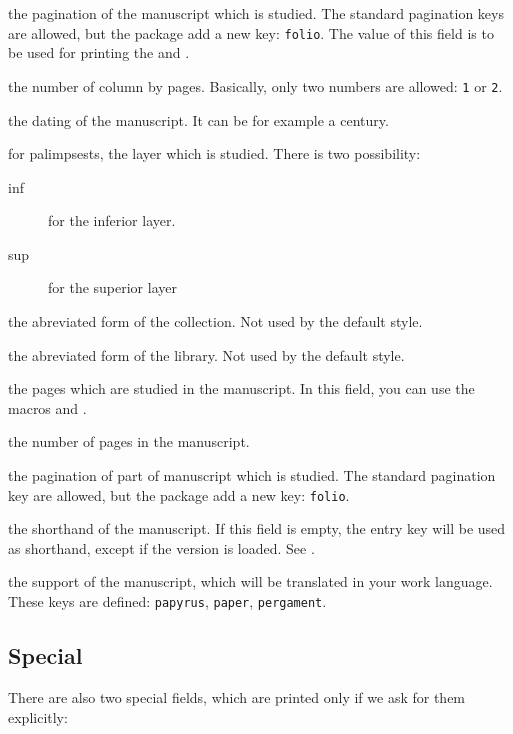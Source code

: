 \documentclass{ltxdockit}[2011/03/25]
\begin{document}
\begin{fieldlist}

 the pagination of the manuscript which is studied. The standard pagination keys are allowed, but the package add a new key: \texttt{folio}. The value of this field is to be used for printing the  and .

 the number of column by pages. Basically, only two numbers are allowed: \verb+1+ or \verb+2+.

 the dating of the manuscript. It can be for example a century.

\label{field:layer} for palimpsests, the layer which is studied. There is two possibility: 
	\begin{description}
		\item[inf] for the inferior layer.
		\item[sup] for the superior layer 
	\end{description}

 the abreviated form of the collection. Not used by the default style.\label{field:shortcollection}


 the abreviated form of the library. Not used by the default style.


 the pages which are studied in the manuscript. In this field, you can use the macros  and .

 the number of pages in the manuscript.


 the pagination of part of manuscript which is studied. The standard pagination key are allowed, but the package add a new key: \verb+folio+.


 the shorthand of the manuscript. If this field is empty, the entry key will be used as shorthand, except if the version  is loaded. See .

 the support of the manuscript, which will be translated in your work language. These keys are defined: \texttt{papyrus}, \texttt{paper}, \texttt{pergament}.

\end{fieldlist}

\subsection{Special}\label{fields:special}
There are also two special fields, which are printed only if we ask for them explicitly:
\end{document}
